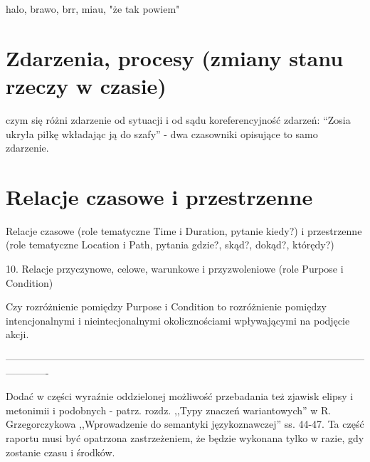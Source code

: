 \documentclass[a4paper, 12pt]{article}
\theoremstyle{remark}
\begin{document}
halo, brawo, brr, miau, "że tak powiem"





\section{Zdarzenia, procesy (zmiany stanu rzeczy w czasie)} %

czym się różni zdarzenie od sytuacji i od sądu
koreferencyjność zdarzeń: ``Zosia ukryła piłkę wkładając ją do szafy'' - dwa czasowniki opisujące to samo zdarzenie.


\section{Relacje czasowe i przestrzenne} %
Relacje czasowe (role tematyczne Time i Duration, pytanie kiedy?) i przestrzenne (role tematyczne Location i Path, pytania gdzie?, skąd?, dokąd?, którędy?)



10. Relacje przyczynowe, celowe, warunkowe i przyzwoleniowe (role Purpose i Condition)



Czy rozróżnienie pomiędzy Purpose i Condition to rozróżnienie pomiędzy intencjonalnymi i nieintecjonalnymi okolicznościami wpływającymi na podjęcie akcji.




-------------------------------------------------------------------------------------------------------------------------



Dodać w części wyraźnie oddzielonej możliwość przebadania też zjawisk elipsy i metonimii i podobnych - patrz. rozdz. ,,Typy znaczeń wariantowych'' w R. Grzegorczykowa ,,Wprowadzenie do semantyki językoznawczej'' ss. 44-47. Ta część raportu musi być opatrzona zastrzeżeniem, że będzie wykonana tylko w razie, gdy zostanie czasu i środków.

\end{document}
